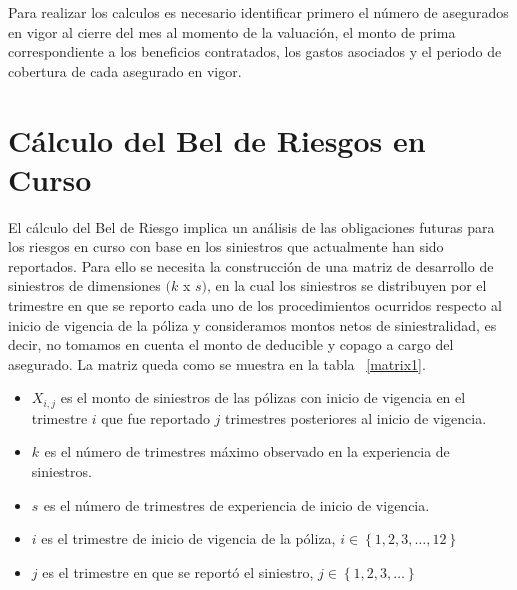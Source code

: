 \documentclass[11pt,twoside,openright,spanish]{report}
\numberwithin{equation}{chapter}
\numberwithin{figure}{chapter}
\numberwithin{table}{chapter}
\begin{document}
	Para realizar los calculos es necesario identificar primero el número de asegurados en vigor al cierre del mes al momento de la valuación, el monto de prima correspondiente a los beneficios contratados, los gastos asociados y el periodo de cobertura de cada asegurado en vigor.
		
	\section{Cálculo del Bel de Riesgos en Curso}

	El cálculo del Bel de Riesgo implica un análisis de las obligaciones futuras para los riesgos en curso con base en los siniestros que actualmente han sido reportados. Para ello se necesita la construcción de una matriz de desarrollo de siniestros  de dimensiones $(k$ x $s)$, en la cual los siniestros se distribuyen por el trimestre en que se reporto cada uno de los procedimientos ocurridos respecto al inicio de vigencia de la póliza y consideramos montos netos de siniestralidad, es decir, no tomamos en cuenta el monto de deducible y copago a cargo del asegurado. La matriz queda como se muestra en la tabla ~\ref{matrix1}.

	\vspace{0.1cm}
	
	\begin{itemize}
		\setlength\itemsep{-0.5em}
		\item ${X}_{i,j}$ es el monto de siniestros de las pólizas con inicio de vigencia en el trimestre $i$ que fue reportado $j$ trimestres posteriores al inicio de vigencia.
		\item ${k}_{}$ es el número de trimestres máximo observado en la experiencia de siniestros.
		\item ${s}_{}$ es el número de trimestres de experiencia de inicio de vigencia.
		\item $i$ es el trimestre de inicio de vigencia de la póliza, $i\in \left\{1,2,3,\dots ,12\right\}$
		\item $j$ es el trimestre en que se reportó el siniestro,  $j\in \left\{1,2,3,\dots\right\}$
	\end{itemize}
	
	\vspace{1cm}
\end{document}
